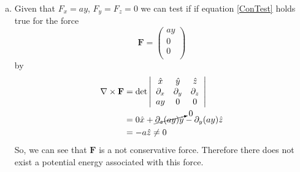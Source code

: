 \documentclass[11pt]{article}
\numberwithin{equation}{section}
\begin{document}
\begin{enumerate}[(a)]
\item Given that $F_x = ay$, $F_y=F_z=0$ we can test if if equation \ref{ConTest} holds 
true for the force 
$$\mathbf{F} = \left(\begin{array}{c}
                        ay\\
                        0\\
                        0\\
            \end{array}\right)$$
by
\begin{align*}
\bold\nabla\times\mathbf{F} &= \det\left|\begin{array}{ccc} \hat{x}     &\hat{y}     &\hat{z}\\
                                                   \partial_x  &\partial_y  &\partial_z\\
                                                   ay          &0           &0
                          \end{array}\right|\\
&= 0\hat{x} + \cancelto{0}{\partial_z(ay)\hat{y}} - \partial_y(ay)\hat{z}\\
&= -a\hat{z}\ne 0
\end{align*}
So, we can see that $\mathbf{F}$ is a not conservative force. Therefore there does not exist 
a potential energy associated with this force.



\end{enumerate}
\end{document}
